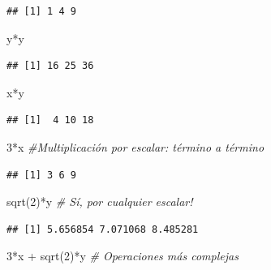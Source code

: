 \documentclass[
]{book}
\newenvironment{Shaded}{\begin{snugshade}}{\end{snugshade}}
\newcommand{\CommentTok}[1]{\textcolor[rgb]{0.56,0.35,0.01}{\textit{#1}}}
\newcommand{\DecValTok}[1]{\textcolor[rgb]{0.00,0.00,0.81}{#1}}
\newcommand{\FunctionTok}[1]{\textcolor[rgb]{0.00,0.00,0.00}{#1}}
\newcommand{\NormalTok}[1]{#1}
\newcommand{\SpecialCharTok}[1]{\textcolor[rgb]{0.00,0.00,0.00}{#1}}
\begin{document}
\begin{verbatim}
## [1] 1 4 9
\end{verbatim}

\begin{Shaded}
\begin{Highlighting}[]
\NormalTok{y}\SpecialCharTok{*}\NormalTok{y}
\end{Highlighting}
\end{Shaded}

\begin{verbatim}
## [1] 16 25 36
\end{verbatim}

\begin{Shaded}
\begin{Highlighting}[]
\NormalTok{x}\SpecialCharTok{*}\NormalTok{y}
\end{Highlighting}
\end{Shaded}

\begin{verbatim}
## [1]  4 10 18
\end{verbatim}

\begin{Shaded}
\begin{Highlighting}[]
\DecValTok{3}\SpecialCharTok{*}\NormalTok{x                }\CommentTok{\#Multiplicación por escalar: término a término}
\end{Highlighting}
\end{Shaded}

\begin{verbatim}
## [1] 3 6 9
\end{verbatim}

\begin{Shaded}
\begin{Highlighting}[]
\FunctionTok{sqrt}\NormalTok{(}\DecValTok{2}\NormalTok{)}\SpecialCharTok{*}\NormalTok{y          }\CommentTok{\# Sí, por cualquier escalar!}
\end{Highlighting}
\end{Shaded}

\begin{verbatim}
## [1] 5.656854 7.071068 8.485281
\end{verbatim}

\begin{Shaded}
\begin{Highlighting}[]
\DecValTok{3}\SpecialCharTok{*}\NormalTok{x }\SpecialCharTok{+} \FunctionTok{sqrt}\NormalTok{(}\DecValTok{2}\NormalTok{)}\SpecialCharTok{*}\NormalTok{y    }\CommentTok{\# Operaciones más complejas}
\end{Highlighting}
\end{Shaded}
\end{document}
